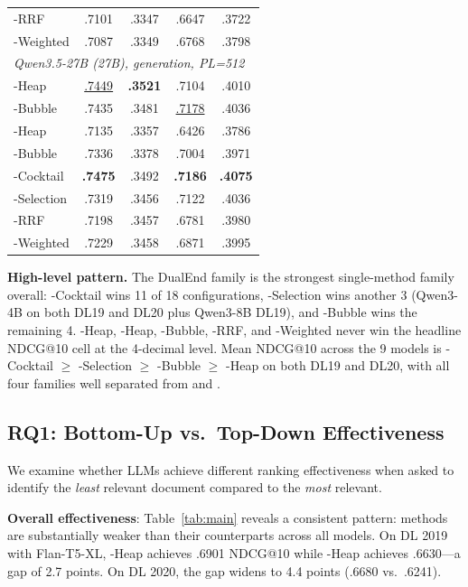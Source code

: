 \begin{table}[!htbp]
\begin{tabular}{l|cc|cc}
\bidir{}-RRF & .7101 & .3347 & .6647 & .3722 \\
\bidir{}-Weighted & .7087 & .3349 & .6768 & .3798 \\
\midrule
\multicolumn{5}{l}{\textit{Qwen3.5-27B (27B), generation, PL=512}} \\
\topdown{}-Heap & \underline{.7449} & \textbf{.3521} & .7104 & .4010 \\
\topdown{}-Bubble & .7435 & .3481 & \underline{.7178} & .4036 \\
\bottomup{}-Heap & .7135 & .3357 & .6426 & .3786 \\
\bottomup{}-Bubble & .7336 & .3378 & .7004 & .3971 \\
\dualend{}-Cocktail & \textbf{.7475} & .3492 & \textbf{.7186} & \textbf{.4075} \\
\dualend{}-Selection & .7319 & .3456 & .7122 & .4036 \\
\bidir{}-RRF & .7198 & .3457 & .6781 & .3980 \\
\bidir{}-Weighted & .7229 & .3458 & .6871 & .3995 \\
\bottomrule
\end{tabular}
\end{table}

\textbf{High-level pattern.} The DualEnd family is the strongest single-method family overall: \dualend{}-Cocktail wins 11 of 18 configurations, \dualend{}-Selection wins another 3 (Qwen3-4B on both DL19 and DL20 plus Qwen3-8B DL19), and \topdown{}-Bubble wins the remaining 4. \topdown{}-Heap, \bottomup{}-Heap, \bottomup{}-Bubble, \bidir{}-RRF, and \bidir{}-Weighted never win the headline NDCG@10 cell at the 4-decimal level. Mean NDCG@10 across the 9 models is \dualend{}-Cocktail $\geq$ \dualend{}-Selection $\geq$ \topdown{}-Bubble $\geq$ \topdown{}-Heap on both DL19 and DL20, with all four families well separated from \bottomup{} and \bidir{}.

\subsection{RQ1: Bottom-Up vs.\ Top-Down Effectiveness}
\label{sec:rq1}

We examine whether LLMs achieve different ranking effectiveness when asked to identify the \emph{least} relevant document compared to the \emph{most} relevant.

\textbf{Overall effectiveness}: Table~\ref{tab:main} reveals a consistent pattern: \bottomup{} methods are substantially weaker than their \topdown{} counterparts across all models. On DL 2019 with Flan-T5-XL, \topdown{}-Heap achieves .6901 NDCG@10 while \bottomup{}-Heap achieves .6630---a gap of 2.7 points. On DL 2020, the gap widens to 4.4 points (.6680 vs.\ .6241).

